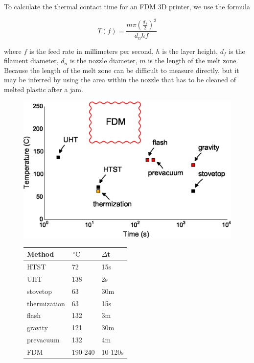 \documentclass[fleqn,10pt]{wlpeerj}
\begin{document}
To calculate the thermal contact time for an FDM 3D printer, we use the
formula

\begin{equation}
T(f) = \frac{m \pi \left(\frac{d_f}{2}\right)^2}{ d_n h f }
\end{equation}

\noindent where $f$ is the feed rate in millimeters per second, $h$ is the
layer height, $d_f$ is the filament diameter, $d_n$ is the nozzle diameter,
$m$ is the length of the melt zone. Because the length of the melt zone can be
difficult to measure directly, but it may be inferred by using the area within
the nozzle that has to be cleaned of melted plastic after a jam.

\begin{figure}
  \begin{minipage}[c]{0.60\linewidth}
    \centering
    \includegraphics[width=\textwidth]{Fig1}
    \par\vspace{0pt}
  \end{minipage}%
  \begin{minipage}[c]{0.40\linewidth}
    \centering%
    
    \begin{tabular}{@{}lll@{}}
    \toprule
    Method       & $\,^{\circ}\mathrm{C}$ & $\Delta$t \\ \midrule
    HTST         & 72      & 15s    \\
    UHT          & 138     & 2s     \\
    stovetop     & 63      & 30m    \\
    thermization & 63      & 15s    \\
    flash        & 132     & 3m     \\
    gravity      & 121     & 30m    \\
    prevacuum    & 132     & 4m     \\
    FDM          & 190-240 & 10-120s\\ \bottomrule
    \end{tabular}


\end{minipage}
\end{figure}
\end{document}
